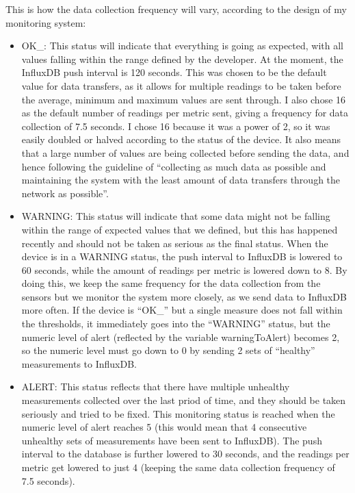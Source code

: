 \documentclass[12pt]{article}
\begin{document}
This is how the data collection frequency will vary, according to the design of my monitoring system: 
\begin{itemize}
    \item OK\_: This status will indicate that everything is going as expected, with all values falling within the range defined by the developer. At the moment, the InfluxDB push interval is 120 seconds. This was chosen to be the default value for data transfers, as it allows for multiple readings to be taken before the average, minimum and maximum values are sent through. I also chose 16 as the default number of readings per metric sent, giving a frequency for data collection of 7.5 seconds. I chose 16 because it was a power of 2, so it was easily doubled or halved according to the status of the device. It also means that a large number of values are being collected before sending the data, and hence following the guideline of ``collecting as much data as possible and maintaining the system with the least amount of data transfers through the network as possible''.
    \item WARNING: This status will indicate that some data might not be falling within the range of expected values that we defined, but this has happened recently and should not be taken as serious as the final status. When the device is in a WARNING status, the push interval to InfluxDB is lowered to 60 seconds, while the amount of readings per metric is lowered down to 8. By doing this, we keep the same frequency for the data collection from the sensors but we monitor the system more closely, as we send data to InfluxDB more often. If the device is ``OK\_'' but a single measure does not fall within the thresholds, it immediately goes into the ``WARNING'' status, but the numeric level of alert (reflected by the variable warningToAlert) becomes 2, so the numeric level must go down to 0 by sending 2 sets of ``healthy'' measurements to InfluxDB.
    \item ALERT: This status reflects that there have multiple unhealthy measurements collected over the last priod of time, and they should be taken seriously and tried to be fixed. This monitoring status is reached when the numeric level of alert reaches 5 (this would mean that 4 consecutive unhealthy sets of measurements have been sent to InfluxDB). The push interval to the database is further lowered to 30 seconds, and the readings per metric get lowered to just 4 (keeping the same data collection frequency of 7.5 seconds). 
\end{itemize}
\end{document}
